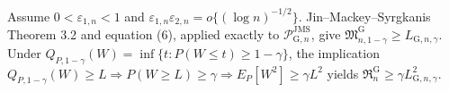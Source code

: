 Assume \(0<\varepsilon_{1,n}<1\) and \(\varepsilon_{1,n}\varepsilon_{2,n}=o\{(\log n)^{-1/2}\}\). Jin--Mackey--Syrgkanis Theorem 3.2 and equation (6), applied exactly to \(\mathcal P_{\mathrm G,n}^{\mathrm{JMS}}\), give \(\mathfrak M_{n,1-\gamma}^{\mathrm G}\ge L_{\mathrm G,n,\gamma}\). Under \(Q_{P,1-\gamma}(W)=\inf\{t:P(W\le t)\ge1-\gamma\}\), the implication \(Q_{P,1-\gamma}(W)\ge L\Rightarrow P(W\ge L)\ge\gamma\Rightarrow E_P[W^2]\ge\gamma L^2\) yields \(\mathfrak R_n^{\mathrm G}\ge\gamma L_{\mathrm G,n,\gamma}^2\).
